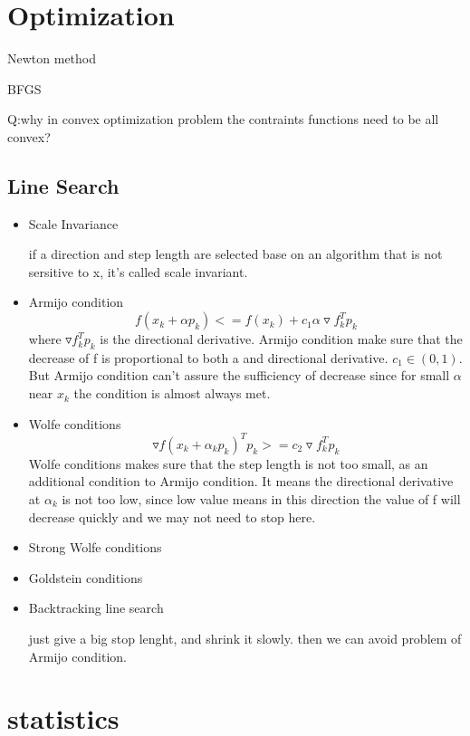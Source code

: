 \documentclass[10pt,a4paper]{book}
\begin{document}
\chapter{Optimization}
 Newton method
 
 BFGS
 
 Q:why in convex optimization problem the contraints functions need to be all convex?
\section {Line Search}
\begin{itemize}
\item Scale Invariance

if a direction and step length are selected base on an algorithm that is not sersitive to x, it's called scale invariant.

\item Armijo condition
$$ f(x_k+\alpha p_k) <= f(x_k) + c_1 \alpha \triangledown f_k^T p_k $$
where $ \triangledown f_k^T p_k $ is the directional derivative. Armijo condition make sure that the decrease of f is proportional to both a and directional derivative. $c_1 \in (0, 1)$. But Armijo condition can't assure the sufficiency of decrease since for small $\alpha$ near $x_k$ the condition is almost always met.

\item Wolfe conditions
$$ \triangledown f(x_k+\alpha_k p_k)^T p_k >= c_2 \triangledown f_k^Tp_k $$
Wolfe conditions makes sure that the step length is not too small, as an additional condition to Armijo condition. It means the directional derivative at $\alpha_k$ is not too low, since low value means in this direction the value of f will decrease quickly and we may not need to stop here.

\item Strong Wolfe conditions

\item Goldstein conditions

\item Backtracking line search

just give a big stop lenght, and shrink it slowly. then we can avoid problem of Armijo condition.

\end{itemize}

\chapter{statistics}
\end{document}
